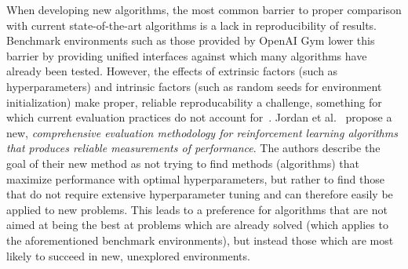 When developing new algorithms, the most common barrier to proper comparison with current state-of-the-art algorithms is a lack in reproducibility of results. Benchmark environments such as those provided by OpenAI Gym \cite{OpenAIGym} lower this barrier by providing unified interfaces against which many algorithms have already been tested. However, the effects of extrinsic factors (such as hyperparameters) and intrinsic factors (such as random seeds for environment initialization) make proper, reliable reproducability a challenge, something for which current evaluation practices do not account for~\cite{DRLThatMatters}. Jordan et al.~\cite{EvaluatingPerformance} propose a new, \emph{comprehensive evaluation methodology for reinforcement learning algorithms that produces reliable measurements of performance}. The authors describe the goal of their new method as not trying to find methods (algorithms) that maximize performance with optimal hyperparameters, but rather to find those that do not require extensive hyperparameter tuning and can therefore easily be applied to new problems. This leads to a preference for algorithms that are not aimed at being the best at problems which are already solved (which applies to the aforementioned benchmark environments), but instead those which are most likely to succeed in new, unexplored environments.